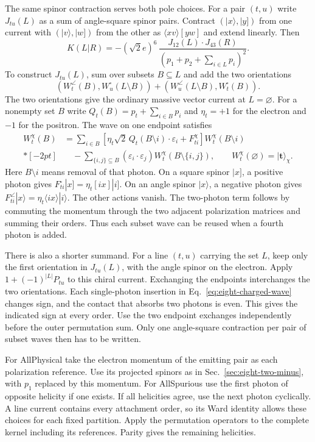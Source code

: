 The same spinor contraction serves both pole choices. For a pair $(t,u)$
write $J_{tu}(L)$ as a sum of angle-square spinor pairs. Contract
$(|x\rangle,|y])$ from one current with $(|v\rangle,|w])$ from the
other as $\langle xv\rangle[yw]$ and extend linearly. Then
\begin{equation}
 K(L|R)=-(\sqrt2 e)^6\,
 \frac{J_{12}(L)\cdot J_{43}(R)}
      {(p_1+p_2+\sum_{i\in L}p_i)^2}.
 \label{eq:eight-four-kernel}
\end{equation}
To construct $J_{tu}(L)$, sum over subsets $B\subseteq L$ and add the
two orientations
\[
 (W_t^\angle(B),W_u^\square(L\setminus B))
  +(W_u^\angle(L\setminus B),W_t^\square(B)).
\]
The two orientations give the ordinary massive vector current at
$L=\varnothing$. For a nonempty set $B$ write $Q_t(B)=p_t+\sum_{i\in B}p_i$
and $\eta_t=+1$ for the electron and $-1$ for the positron.
The wave on one endpoint satisfies
\begin{align}
 [Q_t(B)^2-m^2] W_t^\chi(B)
 &=\sum_{i\in B}\!\left[\eta_t\sqrt2\,
 Q_t(B\setminus i)\cdot\varepsilon_i+F_{ti}^\chi\right]W_t^\chi(B\setminus i)
 \nonumber\\*[-2pt]
 &\quad-\sum_{\{i,j\}\subseteq B}
 (\varepsilon_i\cdot\varepsilon_j)W_t^\chi(B\setminus\{i,j\}),
 \qquad W_t^\chi(\varnothing)=|\mathbf t\rangle_\chi .
 \label{eq:eight-charged-wave}
\end{align}
Here $B\setminus i$ means removal of that photon. On a square spinor
$|x]$, a positive photon gives $F_{ti}^\square|x]=\eta_t[i x]|i]$.
On an angle spinor $|x\rangle$, a negative photon gives
$F_{ti}^\angle|x\rangle=\eta_t\langle i x\rangle|i\rangle$. The other
actions vanish. The two-photon term follows by commuting the momentum
through the two adjacent polarization matrices and summing their
orders. Thus each subset wave can be reused when a fourth photon is
added.

There is also a shorter summand. For a line $(t,u)$ carrying the set
$L$, keep only the first orientation in $J_{tu}(L)$, with the angle
spinor on the electron. Apply $1+(-1)^{|L|}P_{tu}$ to this chiral
current. Exchanging the endpoints interchanges the two orientations.
Each single-photon insertion in Eq.~\eqref{eq:eight-charged-wave}
changes sign, and the contact that absorbs two photons is even. This
gives the indicated sign at every order. Use the two endpoint exchanges
independently before the outer permutation sum. Only one angle-square
contraction per pair of subset waves then has to be written.

For AllPhysical take the electron momentum of the emitting pair as
each polarization reference. Use its projected spinors as in
Sec.~\ref{sec:eight-two-minus}, with $p_1$ replaced by this momentum.
For AllSpurious use the first photon of opposite helicity if one
exists. If all helicities agree, use the next photon cyclically.
A line current contains every attachment order, so its Ward identity
allows these choices for each fixed partition. Apply the permutation
operators to the complete kernel including its references.
Parity gives the remaining helicities.

